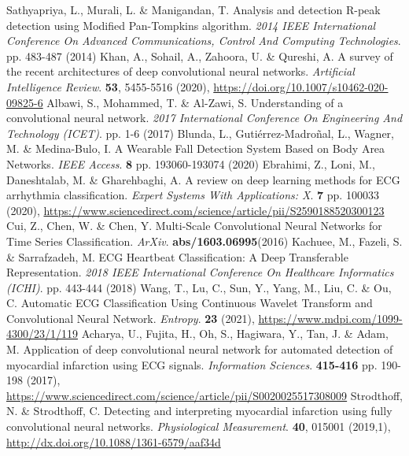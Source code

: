 \documentclass{ieeeaccess}
\begin{document}
\begin{thebibliography}{1}
Sathyapriya, L., Murali, L. \& Manigandan, T. Analysis and detection R-peak detection using Modified Pan-Tompkins algorithm. {\em 2014 IEEE International Conference On Advanced Communications, Control And Computing Technologies}. pp. 483-487 (2014)
Khan, A., Sohail, A., Zahoora, U. \& Qureshi, A. A survey of the recent architectures of deep convolutional neural networks. {\em Artificial Intelligence Review}. \textbf{53}, 5455-5516 (2020), \url{https://doi.org/10.1007/s10462-020-09825-6}
Albawi, S., Mohammed, T. \& Al-Zawi, S. Understanding of a convolutional neural network. {\em 2017 International Conference On Engineering And Technology (ICET)}. pp. 1-6 (2017)
Blunda, L., Gutiérrez-Madroñal, L., Wagner, M. \& Medina-Bulo, I. A Wearable Fall Detection System Based on Body Area Networks. {\em IEEE Access}. \textbf{8} pp. 193060-193074 (2020)
Ebrahimi, Z., Loni, M., Daneshtalab, M. \& Gharehbaghi, A. A review on deep learning methods for ECG arrhythmia classification. {\em Expert Systems With Applications: X}. \textbf{7} pp. 100033 (2020), \url{https://www.sciencedirect.com/science/article/pii/S2590188520300123}
Cui, Z., Chen, W. \& Chen, Y. Multi-Scale Convolutional Neural Networks for Time Series Classification.  {\em ArXiv}. \textbf{abs/1603.06995}(2016)
Kachuee, M., Fazeli, S. \& Sarrafzadeh, M. ECG Heartbeat Classification: A Deep Transferable Representation. {\em 2018 IEEE International Conference On Healthcare Informatics (ICHI)}. pp. 443-444 (2018)
Wang, T., Lu, C., Sun, Y., Yang, M., Liu, C. \& Ou, C. Automatic ECG Classification Using Continuous Wavelet Transform and Convolutional Neural Network. {\em Entropy}. \textbf{23} (2021), \url{https://www.mdpi.com/1099-4300/23/1/119}
Acharya, U., Fujita, H., Oh, S., Hagiwara, Y., Tan, J. \& Adam, M. Application of deep convolutional neural network for automated detection of myocardial infarction using ECG signals. {\em Information Sciences}. \textbf{415-416} pp. 190-198 (2017), \url{https://www.sciencedirect.com/science/article/pii/S0020025517308009}
Strodthoff, N. \& Strodthoff, C. Detecting and interpreting myocardial infarction using fully convolutional neural networks. {\em Physiological Measurement}. \textbf{40}, 015001 (2019,1), \url{http://dx.doi.org/10.1088/1361-6579/aaf34d}



\end{thebibliography}
\end{document}
